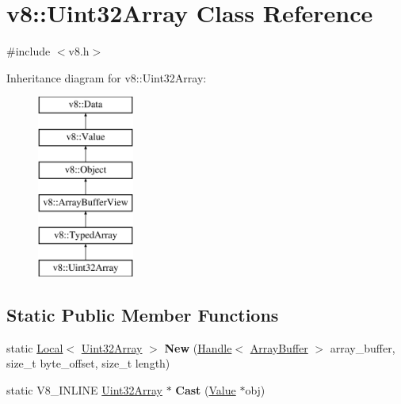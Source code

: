 \hypertarget{classv8_1_1_uint32_array}{}\section{v8\+:\+:Uint32\+Array Class Reference}
\label{classv8_1_1_uint32_array}


{\ttfamily \#include $<$v8.\+h$>$}

Inheritance diagram for v8\+:\+:Uint32\+Array\+:\begin{figure}[H]
\begin{center}
\leavevmode
\includegraphics[height=6.000000cm]{classv8_1_1_uint32_array}
\end{center}
\end{figure}
\subsection*{Static Public Member Functions}
\begin{DoxyCompactItemize}
\item 
\hypertarget{classv8_1_1_uint32_array_a38de3d179f9a569a91ee9aef4d9f923f}{}static \hyperlink{classv8_1_1_local}{Local}$<$ \hyperlink{classv8_1_1_uint32_array}{Uint32\+Array} $>$ {\bfseries New} (\hyperlink{classv8_1_1_local}{Handle}$<$ \hyperlink{classv8_1_1_array_buffer}{Array\+Buffer} $>$ array\+\_\+buffer, size\+\_\+t byte\+\_\+offset, size\+\_\+t length)\label{classv8_1_1_uint32_array_a38de3d179f9a569a91ee9aef4d9f923f}

\item 
\hypertarget{classv8_1_1_uint32_array_ad40e645ee0abac443dba759ee861de49}{}static V8\+\_\+\+I\+N\+L\+I\+N\+E \hyperlink{classv8_1_1_uint32_array}{Uint32\+Array} $\ast$ {\bfseries Cast} (\hyperlink{classv8_1_1_value}{Value} $\ast$obj)\label{classv8_1_1_uint32_array_ad40e645ee0abac443dba759ee861de49}

\end{DoxyCompactItemize}
